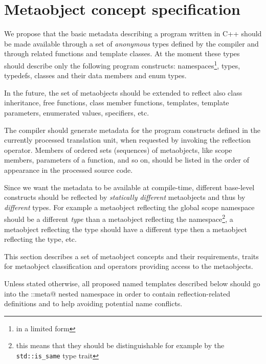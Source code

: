 \section{Metaobject concept specification}
\label{section-current-Concepts}

We propose that the basic metadata describing a program written
in C++ should be made available through a set of {\em anonymous} types
defined by the compiler and through related functions and template classes.
At the moment these types should describe only the following program
constructs: namespaces\footnote{in a limited form}, types, typedefs,
classes and their data members and enum types.

In the future, the set of metaobjects should be extended to reflect also
class inheritance, free functions, class member functions, templates,
template parameters, enumerated values, specifiers, etc.

The compiler should generate metadata for the program constructs defined
in the currently processed translation unit, when requested by invoking
the reflection operator. Members of ordered sets (sequences) of metaobjects,
like scope members, parameters of a function, and so on, should be listed
in the order of appearance in the processed source code.

Since we want the metadata to be available at compile-time,
different base-level constructs should be reflected by
{\em statically different} metaobjects and thus by {\em different} types.
For example a metaobject reflecting the global scope namespace should
be a different {\em type} than a metaobject reflecting the \verb@std@
namespace\footnote{this means that they should be distinguishable for
example by the \texttt{std::is\_same} type trait},
a metaobject reflecting the \verb@int@ type should
have a different type then a metaobject reflecting the \verb@double@
type, etc.

This section describes a set of metaobject concepts and their requirements,
traits for metaobject classification and operators providing access to the metaobjects.

Unless stated otherwise, all proposed named templates described below should
go into the \verb@std::meta@ nested namespace in order to contain reflection-related
definitions and to help avoiding potential name conflicts.

























